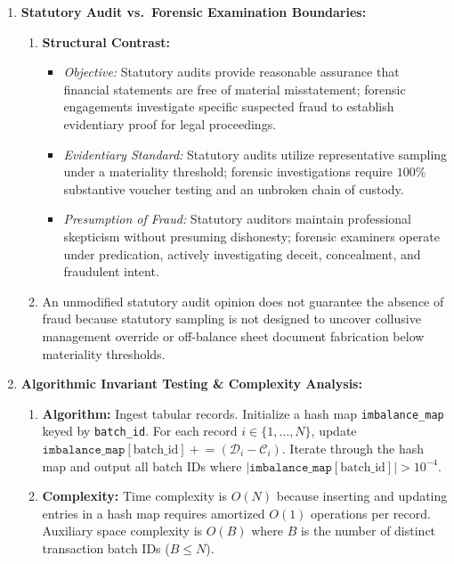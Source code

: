 \begin{enumerate}[label=\textbf{P1.\arabic*}]
    \item \textbf{Statutory Audit vs.~Forensic Examination Boundaries:}
    \begin{enumerate}[label=(\alph*)]
        \item \textbf{Structural Contrast:}
        \begin{itemize}
            \item \textit{Objective:} Statutory audits provide reasonable assurance that financial statements are free of material misstatement; forensic engagements investigate specific suspected fraud to establish evidentiary proof for legal proceedings.
            \item \textit{Evidentiary Standard:} Statutory audits utilize representative sampling under a materiality threshold; forensic investigations require $100\%$ substantive voucher testing and an unbroken chain of custody.
            \item \textit{Presumption of Fraud:} Statutory auditors maintain professional skepticism without presuming dishonesty; forensic examiners operate under predication, actively investigating deceit, concealment, and fraudulent intent.
        \end{itemize}
        \item An unmodified statutory audit opinion does not guarantee the absence of fraud because statutory sampling is not designed to uncover collusive management override or off-balance sheet document fabrication below materiality thresholds.
    \end{enumerate}

    \item \textbf{Algorithmic Invariant Testing \& Complexity Analysis:}
    \begin{enumerate}[label=(\alph*)]
        \item \textbf{Algorithm:} Ingest tabular records. Initialize a hash map \texttt{imbalance\_map} keyed by \texttt{batch\_id}. For each record $i \in \{1, \dots, N\}$, update $\texttt{imbalance\_map}[\text{batch\_id}] \mathrel{+}= (\mathcal{D}_i - \mathcal{C}_i)$. Iterate through the hash map and output all batch IDs where $|\texttt{imbalance\_map}[\text{batch\_id}]| > 10^{-4}$.
        \item \textbf{Complexity:} Time complexity is $O(N)$ because inserting and updating entries in a hash map requires amortized $O(1)$ operations per record. Auxiliary space complexity is $O(B)$ where $B$ is the number of distinct transaction batch IDs ($B \le N$).
    \end{enumerate}


\end{enumerate}
